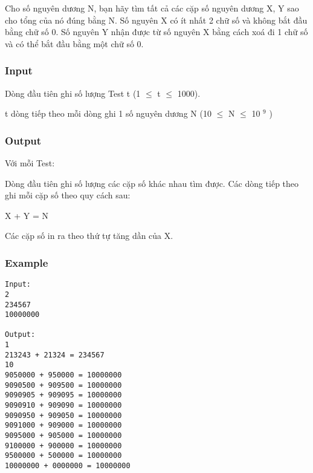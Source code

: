 



   Cho số nguyên dương N, bạn hãy tìm tất cả các cặp số nguyên dương X, Y sao cho tổng của nó đúng bằng N. Số nguyên X có ít nhất 2 chữ số và không bắt đầu bằng chữ số 0. Số nguyên Y nhận được từ số nguyên X bằng cách xoá đi 1 chữ số và có thể bắt đầu bằng một chữ số 0.  

\subsubsection{   Input  }

   Dòng đầu tiên ghi số lượng Test t (1  $\le$  t  $\le$  1000).  

   t dòng tiếp theo mỗi dòng ghi 1 số nguyên dương N (10  $\le$  N  $\le$  10   $^    9   $   )  

\subsubsection{   Output  }

   Với mỗi Test:  

   Dòng đầu tiên ghi số lượng các cặp số khác nhau tìm được.  Các dòng tiếp theo ghi mỗi cặp số theo quy cách sau:  

   X + Y = N  

   Các cặp số in ra theo thứ tự tăng dần của X.  

\subsubsection{   Example  }
\begin{verbatim}
Input:
2
234567
10000000

Output:
1
213243 + 21324 = 234567
10
9050000 + 950000 = 10000000
9090500 + 909500 = 10000000
9090905 + 909095 = 10000000
9090910 + 909090 = 10000000
9090950 + 909050 = 10000000
9091000 + 909000 = 10000000
9095000 + 905000 = 10000000
9100000 + 900000 = 10000000
9500000 + 500000 = 10000000
10000000 + 0000000 = 10000000

\end{verbatim}
